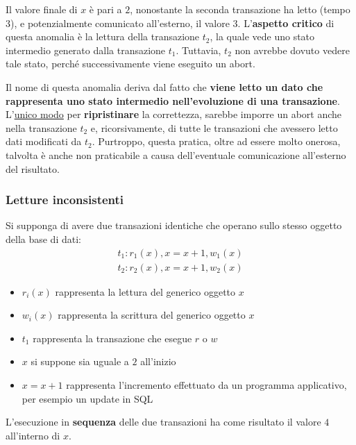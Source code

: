 \documentclass[a4paper]{article}
\begin{document}
	\noindent
	Il valore finale di $x$ è pari a $2$, nonostante la seconda transazione ha letto (tempo $3$), e potenzialmente comunicato all'esterno, il valore $3$. L'\textbf{aspetto critico} di questa anomalia è la lettura della transazione $t_{2}$, la quale vede uno stato intermedio generato dalla transazione $t_{1}$. Tuttavia, $t_{2}$ non avrebbe dovuto vedere tale stato, perché successivamente viene eseguito un \textsf{abort}.\newline
	
	\noindent
	Il nome di questa anomalia deriva dal fatto che \textbf{viene letto un dato che rappresenta uno stato intermedio nell'evoluzione di una transazione}. L'\underline{unico modo} per \textbf{ripristinare} la correttezza, sarebbe imporre un \textsf{abort} anche nella transazione $t_{2}$ e, ricorsivamente, di tutte le transazioni che avessero letto dati modificati da $t_{2}$. Purtroppo, questa pratica, oltre ad essere molto onerosa, talvolta è anche non praticabile a causa dell'eventuale comunicazione all'esterno del risultato.\newpage
	
	\subsubsection{Letture inconsistenti}\label{letture inconsistenti}
	
	Si supponga di avere due transazioni identiche che operano sullo stesso oggetto della base di dati:
	\begin{gather*}
		t_{1} : r_{1}\left(x\right), x = x + 1, w_{1}\left(x\right) \\
		t_{2} : r_{2}\left(x\right), x = x + 1, w_{2}\left(x\right)
	\end{gather*}
	\begin{itemize}
		\item $r_{i}\left(x\right)$ rappresenta la lettura del generico oggetto $x$
		\item $w_{i}\left(x\right)$ rappresenta la scrittura del generico oggetto $x$
		\item $t_{1}$ rappresenta la transazione che esegue $r$ o $w$
		\item $x$ si suppone sia uguale a $2$ all'inizio
		\item $x = x+1$ rappresenta l'incremento effettuato da un programma applicativo, per esempio un \textsf{update} in SQL
	\end{itemize}
	L'esecuzione in \textbf{sequenza} delle due transazioni ha come risultato il valore $4$ all'interno di $x$.\newline
	
\end{document}
